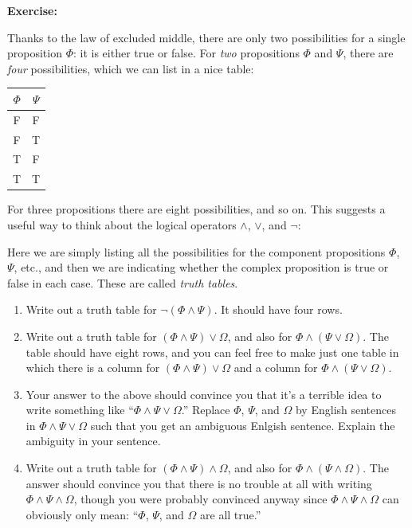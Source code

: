 \documentclass[12pt]{article}
\newcommand{\AND}{\wedge}
\newcommand{\OR}{\vee}
\newcommand{\ex}[1]{\textbf{Exercise:}\begin{adjustwidth}{2em}{}#1\end{adjustwidth}}
\def\pA{\Phi}
\def\pB{\Psi}
\def\pC{\Omega}
\begin{document}
\ex{
Thanks to the law of excluded middle, there are only two possibilities for a single proposition $\pA$: it is either true or false.
For \emph{two} propositions $\pA$ and $\pB$, there are \emph{four} possibilities, which we can list in a nice table:
\begin{center}
\begin{tabular}{|c|c|}
\hline
$\pA$ & $\pB$ \\ \hline
F     & F     \\ \hline
F     & T     \\ \hline
T     & F     \\ \hline
T     & T     \\ \hline
\end{tabular}
\end{center}
For three propositions there are eight possibilities, and so on.
This suggests a useful way to think about the logical operators $\AND$, $\OR$, and $\neg$:
\begin{center}
\truthtablefour{$\pA\AND\pB$}{F}{F}{F}{T}
\sp
\truthtablefour{$\pA\OR\pB$}{F}{T}{T}{T}
\sp
\truthtabletwo{$\neg\pA$}{T}{F}
\end{center}
Here we are simply listing all the possibilities for the component propositions $\pA$, $\pB$, etc.,
and then we are indicating whether the complex proposition is true or false in each case. These are called \emph{truth tables}.
\begin{enumerate}
\item
Write out a truth table for $\neg(\pA\AND\pB)$. It should have four rows.

\item
Write out a truth table for $(\pA\AND\pB)\OR\pC$, and also for $\pA\AND(\pB\OR\pC)$.
The table should have eight rows, and you can feel free to make just one table in which 
there is a column for $(\pA\AND\pB)\OR\pC$ and a column for $\pA\AND(\pB\OR\pC)$.

\item
Your answer to the above should convince you that it's a terrible idea to write something like ``$\pA\AND\pB\OR\pC$.''
Replace $\pA$, $\pB$, and $\pC$ by English sentences in $\pA\AND\pB\OR\pC$ such that you get an ambiguous Enlgish sentence.
Explain the ambiguity in your sentence.

\item \label{itm:truthtables:first_equiv}
Write out a truth table for $(\pA\AND\pB)\AND\pC$, and also for $\pA\AND(\pB\AND\pC)$.
The answer should convince you that there is no trouble at all with writing $\pA\AND\pB\AND\pC$,
though you were probably convinced anyway since $\pA\AND\pB\AND\pC$ can obviously only mean:
``$\pA$, $\pB$, and $\pC$ are all true.''


\end{enumerate}}
\end{document}
